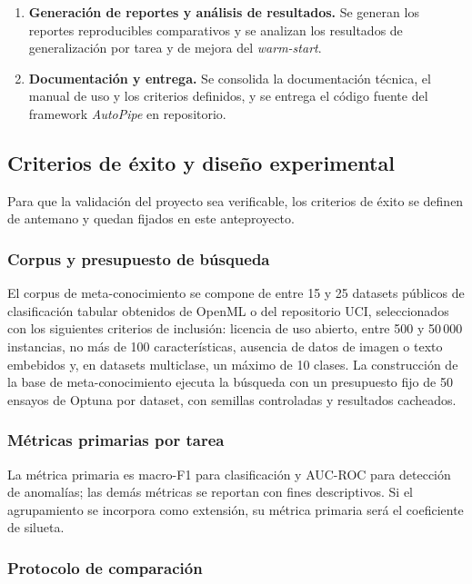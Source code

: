 \documentclass[12pt,letterpaper]{article}
\begin{document}
\begin{enumerate}
  \item \textbf{Generación de reportes y análisis de resultados.} Se generan los reportes reproducibles comparativos y se analizan los resultados de generalización por tarea y de mejora del \textit{warm-start}.

  \item \textbf{Documentación y entrega.} Se consolida la documentación técnica, el manual de uso y los criterios definidos, y se entrega el código fuente del framework \textit{AutoPipe} en repositorio.
\end{enumerate}

\subsection{Criterios de éxito y diseño experimental}
\label{subsec:criterios}

Para que la validación del proyecto sea verificable, los criterios de éxito se definen de antemano y quedan fijados en este anteproyecto.

\subsubsection{Corpus y presupuesto de búsqueda}

El corpus de meta-conocimiento se compone de entre 15 y 25 datasets públicos de clasificación tabular obtenidos de OpenML o del repositorio UCI, seleccionados con los siguientes criterios de inclusión: licencia de uso abierto, entre 500 y 50\,000 instancias, no más de 100 características, ausencia de datos de imagen o texto embebidos y, en datasets multiclase, un máximo de 10 clases. La construcción de la base de meta-conocimiento ejecuta la búsqueda con un presupuesto fijo de 50 ensayos de Optuna por dataset, con semillas controladas y resultados cacheados.

\subsubsection{Métricas primarias por tarea}

La métrica primaria es macro-F1 para clasificación y AUC-ROC para detección de anomalías; las demás métricas se reportan con fines descriptivos. Si el agrupamiento se incorpora como extensión, su métrica primaria será el coeficiente de silueta.

\subsubsection{Protocolo de comparación}
\end{document}
